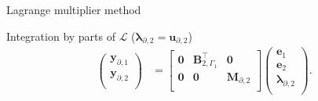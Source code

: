 \documentclass[aspectratio=169]{ISAE-Beamer}
\begin{document}
\begin{frame}{Lagrange multiplier method}
{\begin{block}{Integration by parts of $\mathcal{L}$ ($\bm{\lambda}_{\partial, 2} = \bm{u}_{\partial, 2}$)}
\begin{equation*}
\begin{aligned}
\begin{pmatrix}
	\mathbf{y}_{\partial, 1} \\
	\mathbf{y}_{\partial, 2} \\
	\end{pmatrix}
	&= \begin{bmatrix}
	\mathbf{0} & \mathbf{B}_{2, \Gamma_1}^\top & \mathbf{0} \\
	\mathbf{0} & \mathbf{0} & \mathbf{M}_{\partial, 2} \\
	\end{bmatrix}\begin{pmatrix}
	\mathbf{e}_{1} \\
	\mathbf{e}_{2} \\
	{\bm{\lambda}}_{\partial, 2} \\
	\end{pmatrix}.
	\end{aligned}
	\end{equation*}
\end{block}
}

\end{frame}
\end{document}
